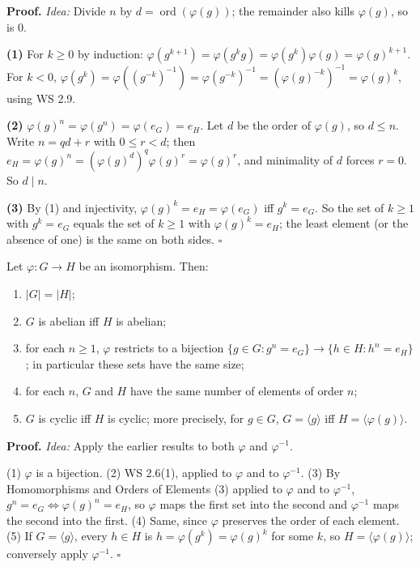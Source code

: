 \documentclass[11pt]{report}
\renewenvironment{proof}[1][Proof]{\noindent\textbf{#1.} }{\hfill$\square$\par\vspace{5pt}}
\begin{document}
\begin{proof}
\textit{Idea:} Divide $n$ by $d = \operatorname{ord}(\varphi(g))$; the remainder also kills $\varphi(g)$, so is $0$.\par
\textbf{(1)} For $k \geq 0$ by induction: $\varphi(g^{k+1}) = \varphi(g^k g) = \varphi(g^k)\varphi(g) = \varphi(g)^{k+1}$. For $k < 0$, $\varphi(g^k) = \varphi((g^{-k})^{-1}) = \varphi(g^{-k})^{-1} = (\varphi(g)^{-k})^{-1} = \varphi(g)^k$, using WS 2.9.

\textbf{(2)} $\varphi(g)^n = \varphi(g^n) = \varphi(e_G) = e_H$. Let $d$ be the order of $\varphi(g)$, so $d \leq n$. Write $n = qd + r$ with $0 \leq r < d$; then $e_H = \varphi(g)^n = (\varphi(g)^d)^q \varphi(g)^r = \varphi(g)^r$, and minimality of $d$ forces $r = 0$. So $d \mid n$.

\textbf{(3)} By (1) and injectivity, $\varphi(g)^k = e_H = \varphi(e_G)$ iff $g^k = e_G$. So the set of $k \geq 1$ with $g^k = e_G$ equals the set of $k \geq 1$ with $\varphi(g)^k = e_H$; the least element (or the absence of one) is the same on both sides.
\end{proof}

\begin{propbox}\label{prop:isomorphism-invariants}
Let $\varphi: G \to H$ be an isomorphism. Then:
\begin{enumerate}
    \item $|G| = |H|$;
    \item $G$ is abelian iff $H$ is abelian;
    \item for each $n \geq 1$, $\varphi$ restricts to a bijection $\{g \in G : g^n = e_G\} \to \{h \in H : h^n = e_H\}$; in particular these sets have the same size;
    \item for each $n$, $G$ and $H$ have the same number of elements of order $n$;
    \item $G$ is cyclic iff $H$ is cyclic; more precisely, for $g \in G$, $G = \langle g \rangle$ iff $H = \langle \varphi(g) \rangle$.
\end{enumerate}
\end{propbox}

\begin{proof}
\textit{Idea:} Apply the earlier results to both $\varphi$ and $\varphi^{-1}$.\par
(1) $\varphi$ is a bijection. (2) WS 2.6(1), applied to $\varphi$ and to $\varphi^{-1}$. (3) By Homomorphisms and Orders of Elements (3) applied to $\varphi$ and to $\varphi^{-1}$, $g^n = e_G \iff \varphi(g)^n = e_H$, so $\varphi$ maps the first set into the second and $\varphi^{-1}$ maps the second into the first. (4) Same, since $\varphi$ preserves the order of each element. (5) If $G = \langle g \rangle$, every $h \in H$ is $h = \varphi(g^k) = \varphi(g)^k$ for some $k$, so $H = \langle \varphi(g) \rangle$; conversely apply $\varphi^{-1}$.
\end{proof}
\end{document}
